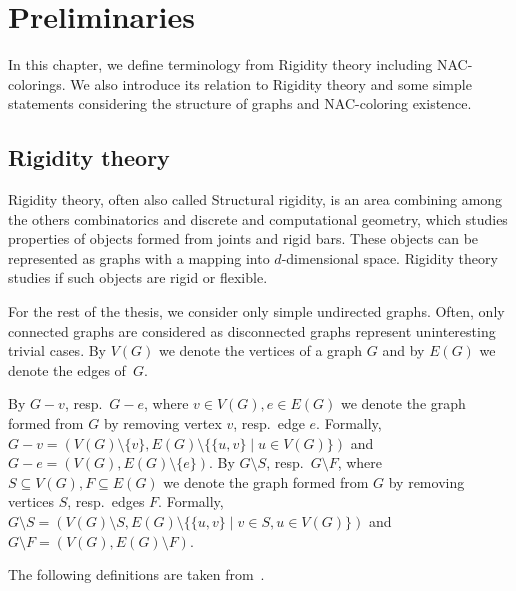 
\chapter{Preliminaries}%
\label{chapter:preliminaries}

\begin{chapterabstract}

	In this chapter, we define terminology from Rigidity theory including NAC-colorings.
	We also introduce its relation to Rigidity theory and
	some simple statements considering
	the structure of graphs and NAC-coloring existence.

\end{chapterabstract}

\section{Rigidity theory}

Rigidity theory, often also called Structural rigidity,
is an area combining among the others
combinatorics and discrete and computational geometry,
which studies properties of objects formed from joints and rigid bars.
These objects can be represented as graphs with
a mapping into \( d \)-dimensional space.
Rigidity theory studies if such objects are rigid or flexible.

For the rest of the thesis,
we consider only simple undirected graphs.
Often, only connected graphs are considered as disconnected graphs
represent uninteresting trivial cases.
By \( V(G) \) we denote the vertices of a graph \( G \) and
by \( E(G) \) we denote the edges of~\( G \).

By \( G - v \), resp.\ \( G - e \),
where \( v \in V(G), e \in E(G) \) we denote the graph
formed from \( G \) by removing vertex \( v \), resp.\ edge \( e \).
Formally,
\( G - v = (V(G) \setminus \{v\}, E(G) \setminus \{\{u, v\} \mid u \in V(G)\}) \)
and \( G - e = (V(G), E(G) \setminus \{e\}) \).
%
By \( G \setminus S \), resp.\ \( G \setminus F \),
where \( S \subseteq V(G), F \subseteq E(G) \) we denote the graph
formed from \( G \) by removing vertices \( S \), resp.\ edges \( F \).
Formally,
\( G \setminus S = (V(G) \setminus S, E(G) \setminus \{\{u, v\} \mid v \in S, u \in V(G)\}) \)
and \( G \setminus F = (V(G), E(G) \setminus F) \).

The following definitions are taken from~\cite{np_complete,my_paper}.

